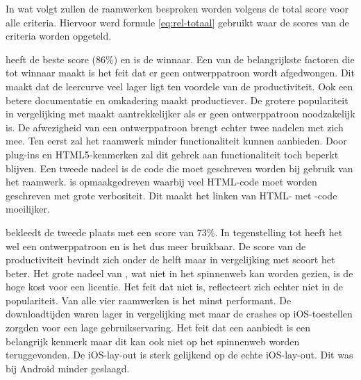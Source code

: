               

In wat volgt zullen de raamwerken besproken worden volgens de total score voor alle criteria.
Hiervoor werd formule \ref{eq:rel-totaal} gebruikt waar de scores van de criteria worden opgeteld.


\jqm{} heeft de beste score ($86\%$) en is de winnaar.
Een van de belangrijkste factoren die \jqm{} tot winnaar maakt is het feit dat er geen ontwerppatroon wordt afgedwongen.
Dit maakt dat de leercurve veel lager ligt ten voordele van de productiviteit.
Ook een betere documentatie en omkadering maakt \jqm{} productiever.
De grotere populariteit in vergelijking met \lungo{} maakt \jqm{} aantrekkelijker als er geen ontwerppatroon noodzakelijk is.
De afwezigheid van een ontwerppatroon brengt echter twee nadelen met zich mee.
Ten eerst zal het raamwerk minder functionaliteit kunnen aanbieden.
Door plug-ins en HTML5-kenmerken zal dit gebrek aan functionaliteit toch beperkt blijven.
Een tweede nadeel is de code die moet geschreven worden bij gebruik van het \jqm{} raamwerk.
\jqm{} is opmaakgedreven waarbij veel HTML-code moet worden geschreven met grote verbositeit.
Dit maakt het linken van HTML- met \js{}-code moeilijker.


\kendo{} bekleedt de tweede plaats met een score van $73\%$.
In tegenstelling tot \jqm{} heeft het wel een ontwerppatroon en is het dus meer bruikbaar.
De score van de productiviteit bevindt zich onder de helft maar in vergelijking met \st{} scoort het beter.
Het grote nadeel van \kendo{},  wat niet in het spinnenweb kan worden gezien,  is de hoge kost voor een licentie.
Het feit dat \kendo{} niet  is, reflecteert zich echter niet in de populariteit.
Van alle vier raamwerken is \kendo{} het minst performant.
De downloadtijden waren lager in vergelijking met \st{} maar de crashes op iOS-toestellen zorgden voor een lage gebruikservaring.
Het feit dat \kendo{} een  aanbiedt is een belangrijk kenmerk maar dit kan ook niet op het spinnenweb worden teruggevonden.
De iOS-lay-out is sterk gelijkend op de echte iOS-lay-out.
Dit was bij Android minder geslaagd.

